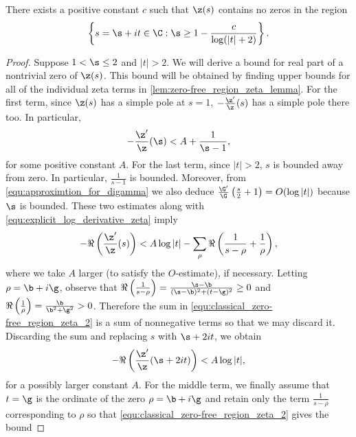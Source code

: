       \begin{theorem}
        There exists a positive constant $c$ such that $\z(s)$ contains no zeros in the region
        \[
          \left\{s = \s+it \in \C:\s \ge 1-\frac{c}{\log(|t|+2)}\right\}.
        \]
      \end{theorem}
      \begin{proof}
        Suppose $1 < \s \le 2$ and $|t| > 2$. We will derive a bound for real part of a nontrivial zero of $\z(s)$. This bound will be obtained by finding upper bounds for all of the individual zeta terms in \cref{lem:zero-free_region_zeta_lemma}. For the first term, since $\z(s)$ has a simple pole at $s = 1$, $-\frac{\z'}{\z}(s)$ has a simple pole there too. In particular,
        \begin{equation}\label{equ:classical_zero-free_region_zeta_1}
          -\frac{\z'}{\z}(\s) < A+\frac{1}{\s-1},
        \end{equation}
        for some positive constant $A$. For the last term, since $|t| > 2$, $s$ is bounded away from zero. In particular, $\frac{1}{s-1}$ is bounded. Moreover, from \cref{equ:approximtion_for_digamma} we also deduce $\frac{\G'}{\G}\left(\frac{s}{2}+1\right) = O(\log|t|)$ because $\s$ is bounded. These two estimates along with \cref{equ:explicit_log_derivative_zeta} imply
        \begin{equation}\label{equ:classical_zero-free_region_zeta_2}
          -\Re\left(\frac{\z'}{\z}(s)\right) < A\log|t|-\sum_{\rho}\Re\left(\frac{1}{s-\rho}+\frac{1}{\rho}\right),
        \end{equation}
        where we take $A$ larger (to satisfy the $O$-estimate), if necessary. Letting $\rho = \b+i\g$, observe that $\Re\left(\frac{1}{s-\rho}\right) = \frac{\s-\b}{(\s-\b)^{2}+(t-\g)^{2}} \ge 0$ and $\Re\left(\frac{1}{\rho}\right) = \frac{\b}{\b^{2}+\g^{2}} > 0$. Therefore the sum in \cref{equ:classical_zero-free_region_zeta_2} is a sum of nonnegative terms so that we may discard it. Discarding the sum and replacing $s$ with $\s+2it$, we obtain
        \begin{equation}\label{equ:classical_zero-free_region_zeta_3}
          -\Re\left(\frac{\z'}{\z}(\s+2it)\right) < A\log|t|,
        \end{equation}
        for a possibly larger constant $A$. For the middle term, we finally assume that $t = \g$ is the ordinate of the zero $\rho = \b+i\g$ and retain only the term $\frac{1}{s-\rho}$ corresponding to $\rho$ so that \cref{equ:classical_zero-free_region_zeta_2} gives the bound

\end{proof}

